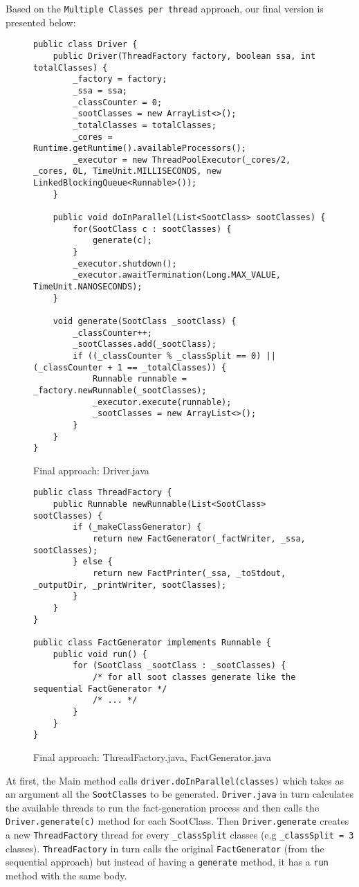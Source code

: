 \documentclass{dithesis}
\begin{document}
        Based on the \texttt{Multiple Classes per thread} approach, our final version is presented below:
                \begin{figure}[H]
\begin{lstlisting}
public class Driver {
    public Driver(ThreadFactory factory, boolean ssa, int totalClasses) {
        _factory = factory;
        _ssa = ssa;
        _classCounter = 0;
        _sootClasses = new ArrayList<>();
        _totalClasses = totalClasses;
        _cores = Runtime.getRuntime().availableProcessors();
        _executor = new ThreadPoolExecutor(_cores/2, _cores, 0L, TimeUnit.MILLISECONDS, new LinkedBlockingQueue<Runnable>());
    }

    public void doInParallel(List<SootClass> sootClasses) {
        for(SootClass c : sootClasses) {
            generate(c);
        }
        _executor.shutdown();
        _executor.awaitTermination(Long.MAX_VALUE, TimeUnit.NANOSECONDS);
    }

    void generate(SootClass _sootClass) {
        _classCounter++;
        _sootClasses.add(_sootClass);
        if ((_classCounter % _classSplit == 0) || (_classCounter + 1 == _totalClasses)) {
            Runnable runnable = _factory.newRunnable(_sootClasses);
            _executor.execute(runnable);
            _sootClasses = new ArrayList<>();
        }
    }
}
\end{lstlisting}
        \caption{Final approach: Driver.java}
        \end{figure}

        \begin{figure}[H]
\begin{lstlisting}
public class ThreadFactory {
    public Runnable newRunnable(List<SootClass> sootClasses) {
        if (_makeClassGenerator) {
            return new FactGenerator(_factWriter, _ssa, sootClasses);
        } else {
            return new FactPrinter(_ssa, _toStdout, _outputDir, _printWriter, sootClasses);
        }
    }
}

public class FactGenerator implements Runnable {
    public void run() {
        for (SootClass _sootClass : _sootClasses) {
            /* for all soot classes generate like the sequential FactGenerator */
            /* ... */
        }
    }
}
\end{lstlisting}
        \caption{Final approach: ThreadFactory.java, FactGenerator.java}
        \end{figure}
        At first, the Main method calls \texttt{driver.doInParallel(classes)} which takes as an argument all the \texttt{SootClasses} to be generated. \texttt{Driver.java} in turn calculates the available threads to run the fact-generation process and then calls the \texttt{Driver.generate(c)} method for each SootClass. Then \texttt{Driver.generate} creates a new \texttt{ThreadFactory} thread for every \texttt{\_classSplit} classes (e.g \texttt{\_classSplit = 3} classes). \texttt{ThreadFactory} in turn calls the original \texttt{FactGenerator} (from the sequential approach) but instead of having a \texttt{generate} method, it has a \texttt{run} method with the same body.
\end{document}
